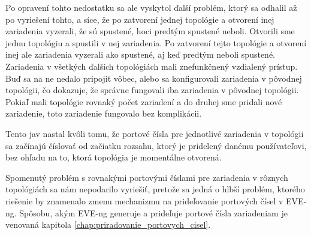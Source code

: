 Po opravení tohto nedostatku sa ale vyskytol ďalší problém, ktorý sa odhalil až po vyriešení tohto, a síce, že po zatvorení jednej topológie 
a otvorení inej 
zariadenia vyzerali, že sú spustené, hoci predtým spustené neboli.
Otvorili sme jednu topológiu a spustili v nej zariadenia. Po zatvorení tejto topológie a otvorení inej ale zariadenia vyzerali ako spustené, aj keď predtým neboli spustené.
Zariadenia v všetkých ďalších topológiách mali znefunkčnený vzdialený prístup. Buď sa na ne nedalo pripojiť vôbec, alebo sa konfigurovali zariadenia v pôvodnej topológii, čo dokazuje, že správne fungovali iba zariadenia v pôvodnej topológii. Pokiaľ mali topológie rovnaký počet zariadení a do druhej sme pridali nové zariadenie, toto zariadenie fungovalo bez komplikácii.

Tento jav nastal kvôli tomu, že portové čísla pre jednotlivé zariadenia v topológii sa začínajú číslovať od začiatku rozsahu, ktorý je pridelený danému používateľovi, bez ohľadu na to, ktorá topológia je momentálne otvorená.

Spomenutý problém s rovnakými portovými číslami pre zariadenia v rôznych topológiách sa nám nepodarilo vyriešiť, pretože sa jedná o hlbší problém, ktorého riešenie by znamenalo zmenu mechanizmu na prideľovanie portových čísel v EVE-ng. Spôsobu, akým EVE-ng generuje a prideľuje portové čísla zariadeniam je venovaná kapitola \ref{chap:priradovanie_portovych_cisel}.

\begin{comment}
\begin{figure}
    \centering
    \texttt{[image: eve\_ng\_zle\_portove\_cisla\_1]}
    \caption{Prvá topológia a celkový počet spustených zariadení}
    \label{obr:eve_ng_zle_portove_cisla_1}
\end{figure}

\begin{figure}
    \centering
    \texttt{[image: eve\_ng\_zle\_portove\_cisla\_2]}
    \caption{Druhá topológia a celkový počet spustených zariadení}
    \label{obr:eve_ng_zle_portove_cisla_2}
\end{figure}
\end{comment}

